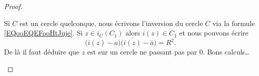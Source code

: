 \begin{proof}
\begin{enumerate}
\begin{subproof}

			      Si \( C\) est un cercle quelconque, nous écrivons l'inversion du cercle \( C\) via la formule \eqref{EQooEQEFooHtJuje}. Si \( z\in i_C(C_1)\) alors \( i(z)\in C_1\) et nous pouvons écrire
			      \begin{equation}
				      \big( i(z)-a \big)\big( \overline{ i(z) }-\bar a \big)=R^2.
			      \end{equation}
			      De là il faut déduire que \( z\) est sur un cercle ne passant pas par \( 0\). Bons calculs\ldots
		      \end{subproof}
	\end{enumerate}
\end{proof}
